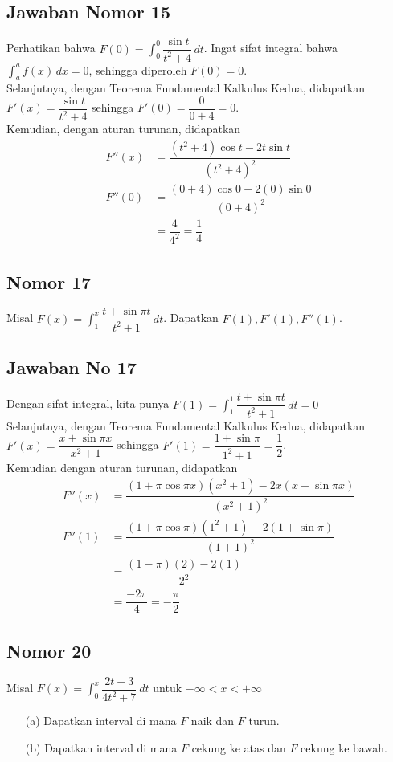 \documentclass{article}
\begin{document}
\subsection*{Jawaban Nomor 15}
Perhatikan bahwa $F(0)=\displaystyle \int_0^0 \dfrac{\sin t}{t^2+4}\, dt$. Ingat sifat integral bahwa $\displaystyle\int_a^a f(x)\, dx=0$, sehingga diperoleh $F(0)=0$.\\
Selanjutnya, dengan Teorema Fundamental Kalkulus Kedua, didapatkan $F'(x)=\dfrac{\sin t}{t^2+4}$ sehingga $F'(0)=\dfrac{0}{0+4}=0$.\\
Kemudian, dengan aturan turunan, didapatkan
\begin{align*}
F''(x) &= \dfrac{(t^2+4)\cos t-2t\sin t}{(t^2+4)^2}\\
F''(0) &= \dfrac{(0+4)\cos 0-2(0)\sin 0}{(0+4)^2}\\
&= \dfrac{4}{4^2} = \dfrac{1}{4}
\end{align*}
\subsection*{Nomor 17}
Misal $F(x)=\displaystyle \int_1^x \dfrac{t+\sin\pi t}{t^2+1}\, dt$. Dapatkan $F(1), F'(1), F''(1)$.
\subsection*{Jawaban No 17}
Dengan sifat integral, kita punya $F(1)=\displaystyle \int_1^1 \dfrac{t+\sin\pi t}{t^2+1}\, dt=0$\\
Selanjutnya, dengan Teorema Fundamental Kalkulus Kedua, didapatkan $F'(x) = \dfrac{x+\sin\pi x}{x^2+1}$ sehingga $F'(1)=\dfrac{1+\sin \pi}{1^2+1}=\dfrac{1}{2}$.\\
Kemudian dengan aturan turunan, didapatkan 
\begin{align*}
F''(x) &= \dfrac{(1+\pi\cos\pi x)(x^2+1)-2x(x+\sin \pi x)}{(x^2+1)^2} \\
F''(1) &= \dfrac{(1+\pi\cos\pi)(1^2+1)-2(1+\sin\pi)}{(1+1)^2}\\
&= \dfrac{(1-\pi)(2)-2(1)}{2^2}\\
&= \dfrac{-2\pi}{4} = -\dfrac{\pi}{2}
\end{align*}
\subsection*{Nomor 20}
Misal $F(x)=\displaystyle \int_0^x \dfrac{2t-3}{4t^2+7}~ dt$ untuk $-\infty <x<+\infty$
	\begin{enumerate}
		\item[(a)] Dapatkan interval di mana $F$ naik dan $F$ turun.
		\item[(b)] Dapatkan interval di mana $F$ cekung ke atas dan $F$ cekung ke bawah.
	\end{enumerate}
\end{document}
